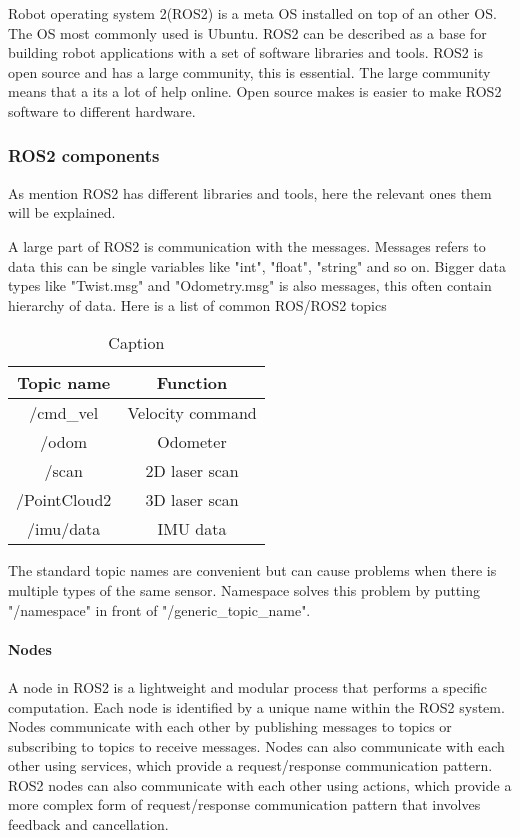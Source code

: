 Robot operating system 2(ROS2) is a meta OS installed on top of an other OS. The OS most commonly used is Ubuntu. ROS2 can be described as a base for building robot applications with a set of software libraries and tools. ROS2 is open source and has a large community, this is essential. The large community means that a its a lot of help online. Open source makes is easier to make ROS2 software to different hardware. 

\subsubsection{ROS2 components} 

As mention ROS2 has different libraries and tools, here the relevant ones them will be explained. 

A large part of ROS2 is communication with the messages. Messages refers to data this can be single variables like "int", "float", "string" and so on. Bigger data types like "Twist.msg" and "Odometry.msg" is also messages, this often contain hierarchy of data. 
Here is a list of common ROS/ROS2 topics 
\begin{table}[H]
    \centering
    \begin{tabular}{c|c}
       Topic name       &  Function         \\ \hline
        /cmd\_vel       & Velocity command  \\
        /odom           & Odometer          \\
        /scan           & 2D laser scan     \\
        /PointCloud2    & 3D laser scan     \\
        /imu/data       & IMU data          \\
    \end{tabular}
    \caption{Caption}
    \label{tab:my_label}
\end{table}

The standard topic names are convenient but can cause problems when there is multiple types of the same sensor. Namespace solves this problem by putting "/namespace" in front of "/generic\_topic\_name".  

\paragraph{Nodes}
A node in ROS2 is a lightweight and modular process that performs a specific computation. Each node is identified by a unique name within the ROS2 system. Nodes communicate with each other by publishing messages to topics or subscribing to topics to receive messages. Nodes can also communicate with each other using services, which provide a request/response communication pattern. ROS2 nodes can also communicate with each other using actions, which provide a more complex form of request/response communication pattern that involves feedback and cancellation. 

